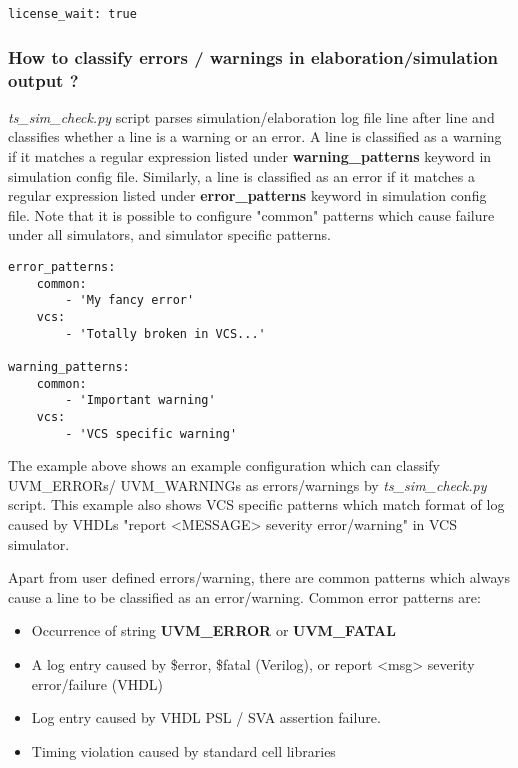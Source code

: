 \documentclass{tropic_design_spec}
\begin{document}
\begin{lstlisting}
license_wait: true
\end{lstlisting}


\subsubsection{How to classify errors / warnings in elaboration/simulation output ?}
\label{sec:how-to-classify-errors-warnings-in-elaboration-simulation-output}

\textit{ts_sim_check.py} script parses simulation/elaboration log file line after line and classifies
whether a line is a warning or an error. A line is classified as a warning if it matches a
regular expression listed under \textbf{warning_patterns} keyword in simulation config
file. Similarly, a line is classified as an error if it matches a regular expression
listed under \textbf{error_patterns} keyword in simulation config file. Note that it is 
possible to configure "common" patterns which cause failure under all simulators, and 
simulator specific patterns.

\begin{lstlisting}
error_patterns:
    common:
        - 'My fancy error'
    vcs:
        - 'Totally broken in VCS...'

warning_patterns:
    common:
        - 'Important warning'
    vcs:
        - 'VCS specific warning'
\end{lstlisting}
 
The example above shows an example configuration which can classify UVM_ERRORs/ UVM_WARNINGs
as errors/warnings by \textit{ts_sim_check.py} script. This example also shows VCS specific
patterns which match format of log caused by VHDLs "report <MESSAGE> severity error/warning"
in VCS simulator.

Apart from user defined errors/warning, there are common patterns which always cause
a line to be classified as an error/warning. Common error patterns are:
\begin{itemize}
    \item {Occurrence of string \textbf{UVM_ERROR} or \textbf{UVM_FATAL}}
    \item {A log entry caused by \$error, \$fatal (Verilog), or report <msg> severity
           error/failure (VHDL)}
    \item {Log entry caused by VHDL PSL / SVA assertion failure.}
    \item {Timing violation caused by standard cell libraries}
\end{itemize}
\end{document}
